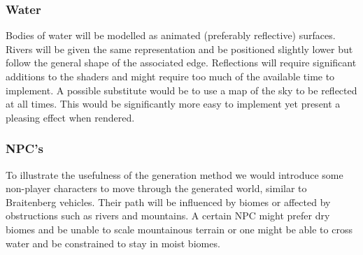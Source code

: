 \subsubsection{Water}

Bodies of water will be modelled as animated (preferably reflective) surfaces. Rivers will be given the same representation and be positioned slightly lower but follow the general shape of the associated edge. Reflections will require significant additions to the shaders and might require too much of the available time to implement. A possible substitute would be to use a map of the sky to be reflected at all times. This would be significantly more easy to implement yet present a pleasing effect when rendered.

\subsubsection{NPC's}

To illustrate the usefulness of the generation method we would introduce some non-player characters to move through the generated world, similar to Braitenberg vehicles. Their path will be influenced by biomes or affected by obstructions such as rivers and mountains. A certain NPC might prefer dry biomes and be unable to scale mountainous terrain or one might be able to cross water and be constrained to stay in moist biomes.